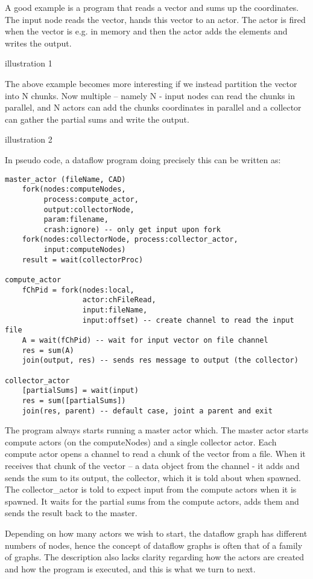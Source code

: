 \documentclass[11pt,a4paper]{article}
\begin{document}
\begin{Example}

A good example is a program that reads a vector and sums up the
 coordinates.  The input node reads the vector, hands this vector to
  an actor.  The actor is fired when the vector is e.g. in memory and
  then the actor adds the elements and writes the output.

illustration 1

The above example becomes more interesting if we instead partition the vector into N chunks. Now multiple – namely N - input nodes can read the chunks in parallel, and N actors can add the chunks coordinates in parallel and a collector can gather the partial sums and write the output.  

illustration 2

In pseudo code, a dataflow program doing precisely this can be written as:
\begin{lstlisting}
master_actor (fileName, CAD)
    fork(nodes:computeNodes, 
         process:compute_actor, 
         output:collectorNode, 
         param:filename, 
         crash:ignore) -- only get input upon fork
    fork(nodes:collectorNode, process:collector_actor, 
         input:computeNodes)
    result = wait(collectorProc)

compute_actor
    fChPid = fork(nodes:local, 
                  actor:chFileRead, 
                  input:fileName, 
                  input:offset) -- create channel to read the input file
    A = wait(fChPid) -- wait for input vector on file channel
    res = sum(A)
    join(output, res) -- sends res message to output (the collector)
 
collector_actor
    [partialSums] = wait(input)
    res = sum([partialSums])
    join(res, parent) -- default case, joint a parent and exit
\end{lstlisting}

The program always starts running a master actor which. The master
actor starts compute actors (on the computeNodes) and a single
collector actor. Each compute actor opens a channel to read a chunk of
the vector from a file. When it receives that chunk of the vector – a
data object from the channel - it adds and sends the sum to its
output, the collector, which it is told about when spawned.  The
collector\_actor is told to expect input from the compute actors when
it is spawned. It waits for the partial sums from the compute actors,
adds them and sends the result back to the master.

Depending on how many actors we wish to start, the dataflow graph has
different numbers of nodes, hence the concept of dataflow graphs is
often that of a family of graphs.  The description also lacks clarity
regarding how the actors are created and how the program is executed,
and this is what we turn to next.

\end{Example}
\end{document}
